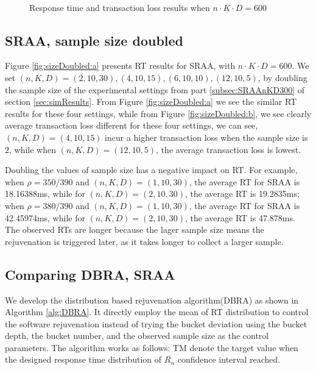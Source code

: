 \documentclass[10pt,journal,letterpaper,compsoc]{IEEEtran}
\begin{document}
\begin{figure}[htb]
\centering
{}
\\
\caption{Response time and transaction loss results when $n\cdot K\cdot D=600$}
\label{fig:sizeDoubled}
\end{figure}

\subsection{SRAA, sample size doubled} %
\label{subsec:SRAAsampleDoubled}
Figure \ref{fig:sizeDoubled:a} presents RT results for SRAA,
with $n\cdot K\cdot D=600$.
We set $(n, K, D)=(2, 10, 30), (4, 10, 15), (6, 10, 10), (12, 10, 5)$,
by doubling the sample size of the experimental settings
from part \ref{subsec:SRAAnKD300} of section \ref{sec:simResults}.
From Figure \ref{fig:sizeDoubled:a} we see the similar RT results
for these four settings, while from Figure \ref{fig:sizeDoubled:b},
we see clearly average transaction loss different for these four settings,
we can see, $(n, K, D)=(4, 10, 15)$ incur a higher transaction loss
when the sample size is 2, while when $(n, K, D)=(12, 10, 5)$,
the average transaction loss is lowest.

Doubling the values of sample size has a negative impact on RT.
For example, when $\rho=350/390$ and $(n, K, D)=(1, 10, 30)$,
the average RT for SRAA is 18.16388ms, while for $(n, K, D)=(2, 10, 30)$,
the average RT is 19.2835ms;
when $\rho=380/390$ and $(n, K, D)=(1, 10, 30)$,
the average RT for SRAA is 42.45974ms, while for $(n, K, D)=(2, 10, 30)$,
the average RT is 47.878ms.
The observed RTs are longer because the lager sample size means the
rejuvenation is triggered later,
as it takes longer to collect a larger sample.

\subsection{Comparing DBRA, SRAA } %
\label{subsec:comparing}
We develop the distribution based rejuvenation algorithm(DBRA) as shown in Algorithm \ref{alg:DBRA}.
It directly employ the mean of RT distribution to control the software rejuvenation
instead of trying the bucket deviation using the bucket depth, the bucket number,
and the observed sample size as the control parameters.
The algorithm works as follows:
TM denote the target value when the designed response time distribution of
$\overline{R_n}$ confidence interval reached.
\end{document}

